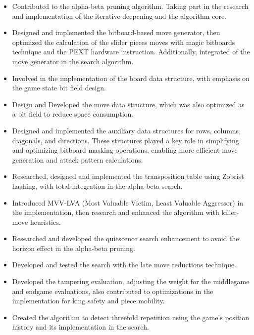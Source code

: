 \begin{itemize}[itemsep=1pt]

    \item Contributed to the alpha-beta pruning algorithm. Taking part in the research and implementation of the iterative deepening and the algorithm core.

    \item Designed and implemented the bitboard-based move generator, then optimized the calculation of the slider pieces moves with magic bitboards technique and the PEXT hardware instruction. Additionally, integrated of the move generator in the search algorithm.

    \item Involved in the implementation of the board data structure, with emphasis on the game state bit field design.

    \item Design and Developed the move data structure, which was also optimized as a bit field to reduce space consumption.    

    \item Designed and implemented the auxiliary data structures for rows, columns, diagonals, and directions. These structures played a key role in simplifying and optimizing bitboard masking operations, enabling more efficient move generation and attack pattern calculations.
    
    \item Researched, designed and implemented the transposition table using Zobrist hashing, with total integration in the alpha-beta search.

    \item Introduced MVV-LVA (Most Valuable Victim, Least Valuable Aggressor) in the implementation, then research and enhanced the algorithm with killer-move heuristics.

    \item Researched and developed the quiescence search enhancement to avoid the horizon effect in the alpha-beta pruning.

    \item Developed and tested the search with the late move reductions technique.

    \item Developed the tampering evaluation, adjusting the weight for the middlegame and endgame evaluations, also contributed to optimizations in the implementation for king safety and piece mobility.

    \item Created the algorithm to detect threefold repetition using the game's position history and its implementation in the search.


\end{itemize}
